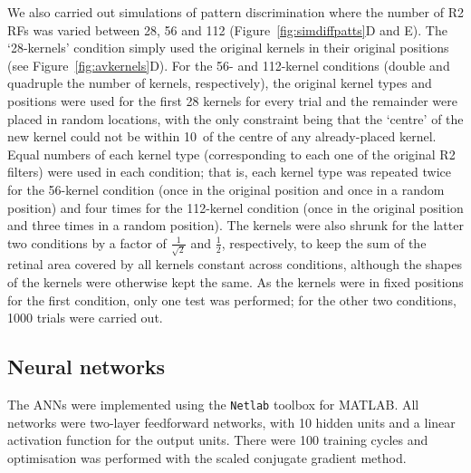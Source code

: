 We also carried out simulations of pattern discrimination where the number of R2 RFs was varied between 28, 56 and 112 (Figure~\ref{fig:simdiffpatts}D and E).
The `28-kernels' condition simply used the original kernels in their original positions (see Figure~\ref{fig:avkernels}D).
For the 56- and 112-kernel conditions (double and quadruple the number of kernels, respectively), the original kernel types and positions were used for the first 28 kernels for every trial and the remainder were placed in random locations, with the only constraint being that the `centre' of the new kernel could not be within 10\degree\ of the centre of any already-placed kernel.
Equal numbers of each kernel type (corresponding to each one of the original R2 filters) were used in each condition; that is, each kernel type was repeated twice for the 56-kernel condition (once in the original position and once in a random position) and four times for the 112-kernel condition (once in the original position and three times in a random position).
The kernels were also shrunk for the latter two conditions by a factor of $\frac{1}{\sqrt{2}}$ and $\frac{1}{2}$, respectively, to keep the sum of the retinal area covered by all kernels constant across conditions, although the shapes of the kernels were otherwise kept the same.
As the kernels were in fixed positions for the first condition, only one test was performed; for the other two conditions, 1000 trials were carried out.

\subsection*{Neural networks}
\label{sec:methods:neuralnetworks}
The ANNs were implemented using the \texttt{Netlab} toolbox for MATLAB.
All networks were two-layer feedforward networks, with 10 hidden units and a linear activation function for the output units.
There were 100 training cycles and optimisation was performed with the scaled conjugate gradient method.

